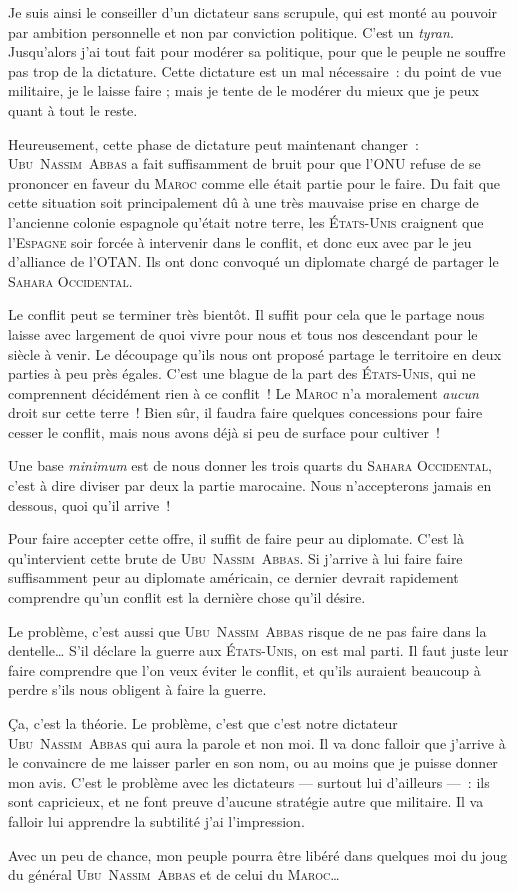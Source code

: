 {	Je suis ainsi le conseiller d’un dictateur sans scrupule, qui est monté au pouvoir par ambition personnelle et non par conviction politique.
	C’est un \emph{tyran}.  Jusqu’alors j’ai tout fait pour modérer sa politique, pour que le peuple ne souffre pas trop de la dictature.
	Cette dictature est un mal nécessaire~:  du point de vue militaire, je le laisse faire ; mais je tente de le modérer du mieux que je peux quant à tout le reste.

	Heureusement, cette phase de dictature peut maintenant changer~:  \textsc{Ubu~Nassim~Abbas} a fait suffisamment de bruit pour que l’\textsc{ONU} refuse de se prononcer en faveur du \textsc{Maroc} comme elle était partie pour le faire.
	Du fait que cette situation soit principalement dû à une très mauvaise prise en charge de l’ancienne colonie espagnole qu’était notre terre, les \textsc{États-Unis} craignent que l’\textsc{Espagne} soir forcée à intervenir dans le conflit, et donc eux avec par le jeu d’alliance de l’\textsc{OTAN}.
	Ils ont donc convoqué un diplomate chargé de partager le \textsc{Sahara Occidental}.

	Le conflit peut se terminer très bientôt.  Il suffit pour cela que le partage nous laisse avec largement de quoi vivre pour nous et tous nos descendant pour le siècle à venir.
	Le découpage qu’ils nous ont proposé partage le territoire en deux parties à peu près égales.
	C’est une blague de la part des \textsc{États-Unis}, qui ne comprennent décidément rien à ce conflit~!
	Le \textsc{Maroc} n’a moralement \emph{aucun} droit sur cette terre~!
	Bien sûr, il faudra faire quelques concessions pour faire cesser le conflit, mais nous avons déjà si peu de surface pour cultiver~!

	Une base \emph{minimum} est de nous donner les trois quarts du \textsc{Sahara Occidental}, c’est à dire diviser par deux la partie marocaine.
	Nous n’accepterons jamais en dessous, quoi qu’il arrive~!

	Pour faire accepter cette offre, il suffit de faire peur au diplomate.
	C’est là qu’intervient cette brute de \textsc{Ubu~Nassim~Abbas}.
	Si j’arrive à lui faire faire suffisamment peur au diplomate américain, ce dernier devrait rapidement comprendre qu’un conflit est la dernière chose qu’il désire.

	Le problème, c’est aussi que \textsc{Ubu~Nassim~Abbas} risque de ne pas faire dans la dentelle…
	S’il déclare la guerre aux \textsc{États-Unis}, on est mal parti.
	Il faut juste leur faire comprendre que l’on veux éviter le conflit, et qu’ils auraient beaucoup à perdre s’ils nous obligent à faire la guerre.

	Ça, c’est la théorie.
	Le problème, c’est que c’est notre dictateur \textsc{Ubu~Nassim~Abbas} qui aura la parole et non moi.
	Il va donc falloir que j’arrive à le convaincre de me laisser parler en son nom, ou au moins que je puisse donner mon avis.
	C’est le problème avec les dictateurs — surtout lui d’ailleurs —~:  ils sont capricieux, et ne font preuve d’aucune stratégie autre que militaire.
	Il va falloir lui apprendre la subtilité j’ai l’impression.

	Avec un peu de chance, mon peuple pourra être libéré dans quelques moi du joug du général \textsc{Ubu~Nassim~Abbas} et de celui du \textsc{Maroc}…
}

